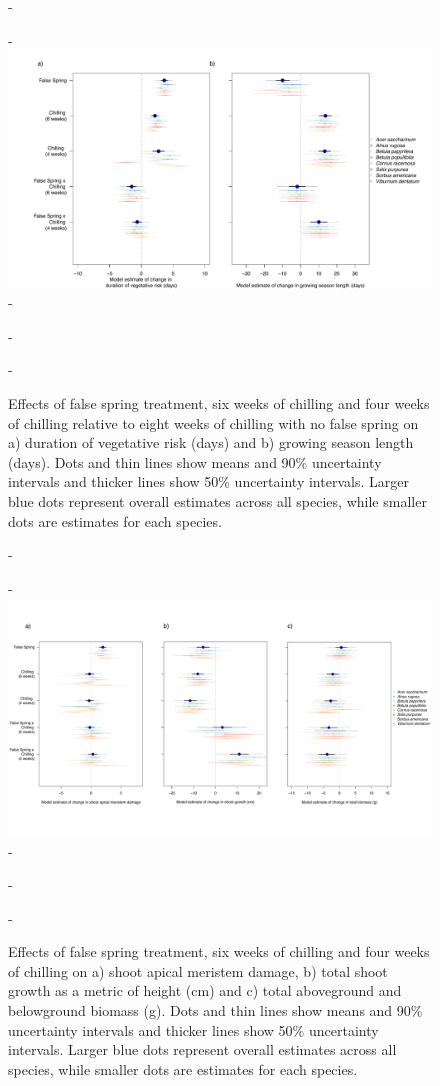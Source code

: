\documentclass{article}\usepackage[]{graphicx}\usepackage[]{color}
\begin{document}
  {\begin{figure} [H]
  -\begin{center}
  -\includegraphics[width=18cm]{..//analyses/figures/mu_phen.pdf} 
  -\caption{Effects of false spring treatment, six weeks of chilling and four weeks of chilling relative to eight weeks of chilling with no false spring on a) duration of vegetative risk (days) and b) growing season length (days). Dots and thin lines show means and 90\% uncertainty intervals and thicker lines show 50\% uncertainty intervals. Larger blue dots represent overall estimates across all species, while smaller dots are estimates for each species. }\label{fig:muphen} 
  -\end{center}
  -\end{figure}}
  
  {\begin{figure} [H]
  -\begin{center}
  -\includegraphics[width=18cm, trim={0, 2cm, 0, 2cm}, clip]{..//analyses/figures/mu_growthbio.pdf} 
  -\caption{Effects of false spring treatment, six weeks of chilling and four weeks of chilling on a) shoot apical meristem damage, b) total shoot growth as a metric of height (cm) and c) total aboveground and belowground biomass (g). Dots and thin lines show means and 90\% uncertainty intervals and thicker lines show 50\% uncertainty intervals. Larger blue dots represent overall estimates across all species, while smaller dots are estimates for each species. }\label{fig:mugrowth} 
  -\end{center}
  -\end{figure}}
  
\end{document}
